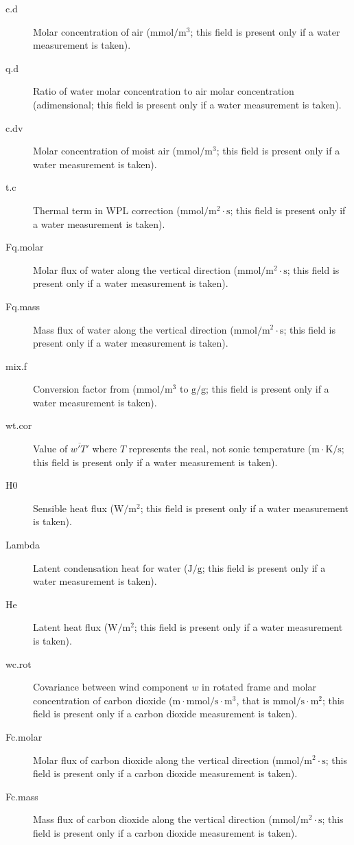\documentclass[a4paper,10pt]{book}
\begin{document}
\begin{description}
 \item[c.d] Molar concentration of air ($\mbox{mmol}/\mbox{m}^3$; this field is present only if a water measurement is taken).
 \item[q.d] Ratio of water molar concentration to air molar concentration (adimensional; this field is present only if a water measurement is taken).
 \item[c.dv] Molar concentration of moist air ($\mbox{mmol}/\mbox{m}^3$; this field is present only if a water measurement is taken).
 \item[t.c] Thermal term in WPL correction ($\mbox{mmol}/\mbox{m}^2 \cdot \mbox{s}$; this field is present only if a water measurement is taken).
 \item[Fq.molar] Molar flux of water along the vertical direction ($\mbox{mmol}/\mbox{m}^2 \cdot \mbox{s}$; this field is present only if a water measurement is taken).
 \item[Fq.mass] Mass flux of water along the vertical direction ($\mbox{mmol}/\mbox{m}^2 \cdot \mbox{s}$; this field is present only if a water measurement is taken).
 \item[mix.f] Conversion factor from  ($\mbox{mmol}/\mbox{m}^3$ to $\mbox{g}/\mbox{g}$; this field is present only if a water measurement is taken).
 \item[wt.cor] Value of $\overline{w'T'}$ where $T$ represents the real, not sonic temperature ($\mbox{m} \cdot \mbox{K}/\mbox{s}$; this field is present only if a water measurement is taken).
 \item[H0] Sensible heat flux ($\mbox{W} / \mbox{m}^2$; this field is present only if a water measurement is taken).
 \item[Lambda] Latent condensation heat for water ($\mbox{J}/\mbox{g}$; this field is present only if a water measurement is taken).
 \item[He] Latent heat flux ($\mbox{W} / \mbox{m}^2$; this field is present only if a water measurement is taken).
 \item[wc.rot] Covariance between wind component $w$ in rotated frame and molar concentration of carbon dioxide ($\mbox{m}\cdot\mbox{mmol}/\mbox{s}\cdot\mbox{m}^3$, that is $\mbox{mmol}/\mbox{s}\cdot\mbox{m}^2$; this field is present only if a carbon dioxide measurement is taken).
 \item[Fc.molar] Molar flux of carbon dioxide along the vertical direction ($\mbox{mmol}/\mbox{m}^2 \cdot \mbox{s}$; this field is present only if a carbon dioxide measurement is taken).
 \item[Fc.mass] Mass flux of carbon dioxide along the vertical direction ($\mbox{mmol}/\mbox{m}^2 \cdot \mbox{s}$; this field is present only if a carbon dioxide measurement is taken).

\end{description}
\end{document}
